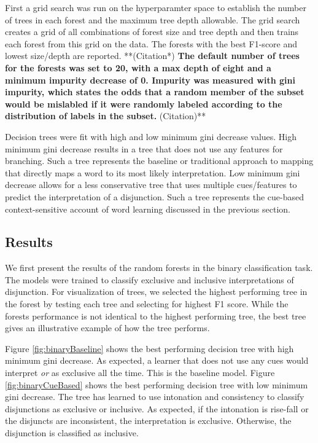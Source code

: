 \documentclass[,man,floatsintext]{apa6}
\begin{document}
First a grid search was run on the hyperparamter space to establish the number of trees in each forest and the maximum tree depth allowable. The grid search creates a grid of all combinations of forest size and tree depth and then trains each forest from this grid on the data. The forests with the best F1-score and lowest size/depth are reported. **(Citation*)\textbf{ The default number of trees for the forests was set to 20, with a max depth of eight and a minimum impurity decrease of 0. Impurity was measured with gini impurity, which states the odds that a random member of the subset would be mislabled if it were randomly labeled according to the distribution of labels in the subset. }(Citation)**

Decision trees were fit with high and low minimum gini decrease values. High minimum gini decrease results in a tree that does not use any features for branching. Such a tree represents the baseline or traditional approach to mapping that directly maps a word to its most likely interpretation. Low minimum gini decrease allows for a less conservative tree that uses multiple cues/features to predict the interpretation of a disjunction. Such a tree represents the cue-based context-sensitive account of word learning discussed in the previous section.

\hypertarget{results-1}{%
\subsection{Results}\label{results-1}}

We first present the results of the random forests in the binary classification task. The models were trained to classify exclusive and inclusive interpretations of disjunction. For visualization of trees, we selected the highest performing tree in the forest by testing each tree and selecting for highest F1 score. While the forests performance is not identical to the highest performing tree, the best tree gives an illustrative example of how the tree performs.

Figure \ref{fig:binaryBaseline} shows the best performing decision tree with high minimum gini decrease. As expected, a learner that does not use any cues would interpret \emph{or} as exclusive all the time. This is the baseline model. Figure \ref{fig:binaryCueBased} shows the best performing decision tree with low minimum gini decrease. The tree has learned to use intonation and consistency to classify disjunctions as exclusive or inclusive. As expected, if the intonation is rise-fall or the disjuncts are inconsistent, the interpretation is exclusive. Otherwise, the disjunction is classified as inclusive.
\end{document}

